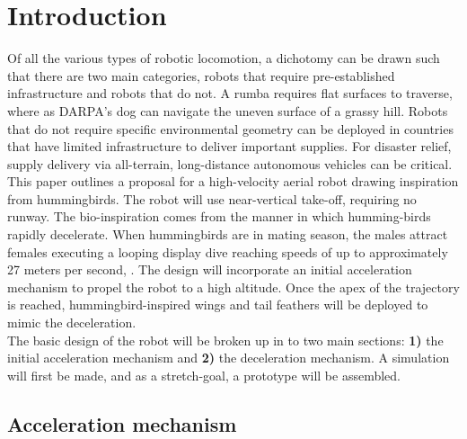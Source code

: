 \section{Introduction}
\label{intro}

Of all the various types of robotic locomotion, a dichotomy can be drawn such that
there are two main categories, robots that require pre-established infrastructure and robots that do not. A rumba requires flat surfaces to traverse, where as DARPA's dog can navigate the uneven surface of a grassy hill. Robots that do not require specific environmental geometry can be deployed in countries that have limited infrastructure to deliver important supplies. For disaster relief, supply delivery via all-terrain, long-distance autonomous vehicles can be critical. \\

This paper outlines a proposal for a high-velocity aerial robot drawing
inspiration from hummingbirds. The robot will use near-vertical take-off, requiring no runway. The bio-inspiration comes from the manner in which humming-birds rapidly decelerate. When hummingbirds are in mating season, the males attract females executing a looping display dive reaching speeds of up to approximately 27 meters per second, \cite{Clark:2009}. The design will incorporate an initial acceleration mechanism to propel the robot to a high altitude. Once the apex of the trajectory is reached, hummingbird-inspired wings and tail feathers will be deployed to mimic the deceleration. \\

The basic design of the robot will be broken up in to two main sections: \textbf{1)} the initial acceleration mechanism and \textbf{2)} the deceleration mechanism. A simulation will first be made, and as a stretch-goal, a prototype will be assembled.

\subsection{Acceleration mechanism}
